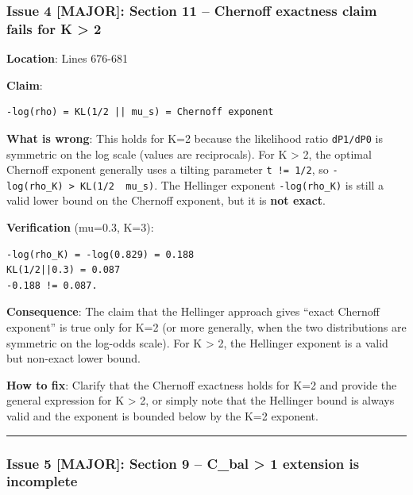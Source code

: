 \documentclass[
  12pt,
]{ctexart}
\begin{document}
\subsubsection{Issue 4 {[}MAJOR{]}: Section 11 -- Chernoff exactness
claim fails for K \textgreater{}
2}\label{issue-4-major-section-11-chernoff-exactness-claim-fails-for-k-2}

\textbf{Location}: Lines 676-681

\textbf{Claim}:

\begin{verbatim}
-log(rho) = KL(1/2 || mu_s) = Chernoff exponent
\end{verbatim}

\textbf{What is wrong}: This holds for K=2 because the likelihood ratio
\texttt{dP1/dP0} is symmetric on the log scale (values are reciprocals).
For K \textgreater{} 2, the optimal Chernoff exponent generally uses a
tilting parameter \texttt{t\ !=\ 1/2}, so
\texttt{-log(rho\_K)\ \textgreater{}\ KL(1/2\ \textbar{}\textbar{}\ mu\_s)}.
The Hellinger exponent \texttt{-log(rho\_K)} is still a valid lower
bound on the Chernoff exponent, but it is \textbf{not exact}.

\textbf{Verification} (mu=0.3, K=3):

\begin{verbatim}
-log(rho_K) = -log(0.829) = 0.188
KL(1/2||0.3) = 0.087
-0.188 != 0.087.
\end{verbatim}

\textbf{Consequence}: The claim that the Hellinger approach gives
``exact Chernoff exponent'' is true only for K=2 (or more generally,
when the two distributions are symmetric on the log-odds scale). For K
\textgreater{} 2, the Hellinger exponent is a valid but non-exact lower
bound.

\textbf{How to fix}: Clarify that the Chernoff exactness holds for K=2
and provide the general expression for K \textgreater{} 2, or simply
note that the Hellinger bound is always valid and the exponent is
bounded below by the K=2 exponent.

\begin{center}\rule{0.5\linewidth}{0.5pt}\end{center}

\subsubsection{Issue 5 {[}MAJOR{]}: Section 9 -- C\_bal \textgreater{} 1
extension is
incomplete}\label{issue-5-major-section-9-c_bal-1-extension-is-incomplete}
\end{document}
